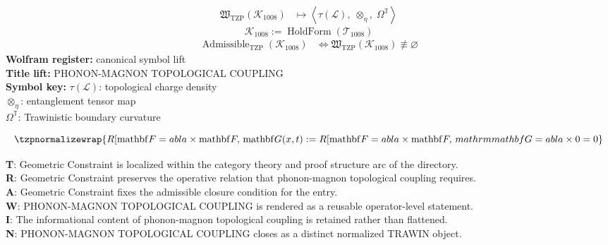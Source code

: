 \noindent
\begin{minipage}[t]{0.48\linewidth}
\begingroup
\small
\[
\begin{aligned}
\mathfrak{W}_{\mathrm{TZP}}\!\left(\mathcal{K}_{1008}\right)
&\longmapsto
\left\langle \tau(\mathcal{L}),\; \otimes_{\eta},\; \Omega^{\mathbb{T}} \right\rangle
\end{aligned}
\]
\[
\mathcal{K}_{1008}
:=
\operatorname{HoldForm}\!\left(\mathcal{T}_{1008}\right)
\]
\[
\begin{aligned}
\operatorname{Admissible}_{\mathrm{TZP}}\!\left(\mathcal{K}_{1008}\right)
&\Longleftrightarrow
\mathfrak{W}_{\mathrm{TZP}}\!\left(\mathcal{K}_{1008}\right)\not\equiv\varnothing
\end{aligned}
\]
\textbf{Wolfram register:} canonical symbol lift\\
\textbf{Title lift:} PHONON-MAGNON TOPOLOGICAL COUPLING\\
\textbf{Symbol key:} \(\tau(\mathcal{L})\): topological charge density\\ \(\otimes_{\eta}\): entanglement tensor map\\ \(\Omega^{\mathbb{T}}\): Trawinistic boundary curvature
\par
\endgroup
\end{minipage}\hfill
\begin{minipage}[t]{0.48\linewidth}
\[
\tzpnormalizewrap{R[\mathrm{mathbf}{F} =  abla\times \mathrm{mathbf}{F},\,\mathrm{mathbf}{G}(x,t) := R[\mathrm{mathbf}{F} =  abla\times \mathrm{mathbf}{F},\,mathrm{mathbf}{G} =  abla\times 0 = 0}
\]

\small
\textbf{T}: Geometric Constraint is localized within the category theory and proof structure arc of the directory.\\
\textbf{R}: Geometric Constraint preserves the operative relation that phonon-magnon topological coupling requires.\\
\textbf{A}: Geometric Constraint fixes the admissible closure condition for the entry.\\
\textbf{W}: PHONON-MAGNON TOPOLOGICAL COUPLING is rendered as a reusable operator-level statement.\\
\textbf{I}: The informational content of phonon-magnon topological coupling is retained rather than flattened.\\
\textbf{N}: PHONON-MAGNON TOPOLOGICAL COUPLING closes as a distinct normalized TRAWIN object.
\normalsize
\end{minipage}

